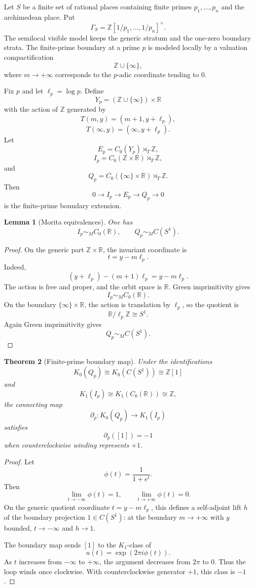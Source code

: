 \documentclass[11pt]{article}
\newtheorem{theorem}{Theorem}[section]
\newtheorem{lemma}[theorem]{Lemma}
\newcommand{\ZZ}{\mathbb Z}
\newcommand{\RR}{\mathbb R}
\begin{document}
Let $S$ be a finite set of rational places containing finite primes $p_1,\ldots,p_n$ and the archimedean place.  Put
\[
        \Gamma_S=\ZZ[1/p_1,\ldots,1/p_n]^\times.
\]
The semilocal visible model keeps the generic stratum and the one-zero boundary strata.  The finite-prime boundary at a prime $p$ is modeled locally by a valuation compactification
\[
        \ZZ\cup\{\infty\},
\]
where $m\to+\infty$ corresponds to the $p$-adic coordinate tending to $0$.

Fix $p$ and let $\ell_p=\log p$.  Define
\[
        Y_p=(\ZZ\cup\{\infty\})\times\RR
\]
with the action of $\ZZ$ generated by
\[
        T(m,y)=(m+1,y+\ell_p),
\]
\[
        T(\infty,y)=(\infty,y+\ell_p).
\]
Let
\[
        E_p=C_0(Y_p)\rtimes_T\ZZ,
\]
\[
        I_p=C_0(\ZZ\times\RR)\rtimes_T\ZZ,
\]
and
\[
        Q_p=C_0(\{\infty\}\times\RR)\rtimes_T\ZZ.
\]
Then
\[
        0\to I_p\to E_p\to Q_p\to0
\]
is the finite-prime boundary extension.

\begin{lemma}[Morita equivalences]
One has
\[
        I_p\sim_M C_0(\RR),
        \qquad Q_p\sim_M C(S^1).
\]
\end{lemma}

\begin{proof}
On the generic part $\ZZ\times\RR$, the invariant coordinate is
\[
        t=y-m\ell_p.
\]
Indeed,
\[
        (y+\ell_p)-(m+1)\ell_p=y-m\ell_p.
\]
The action is free and proper, and the orbit space is $\RR$.  Green imprimitivity gives
\[
        I_p\sim_M C_0(\RR).
\]
On the boundary $\{\infty\}\times\RR$, the action is translation by $\ell_p$, so the quotient is
\[
        \RR/\ell_p\ZZ\cong S^1.
\]
Again Green imprimitivity gives
\[
        Q_p\sim_M C(S^1).
\]
\end{proof}

\begin{theorem}[Finite-prime boundary map]
Under the identifications
\[
        K_0(Q_p)\cong K_0(C(S^1))\cong\ZZ[1]
\]
and
\[
        K_1(I_p)\cong K_1(C_0(\RR))\cong\ZZ,
\]
the connecting map
\[
        \partial_p:K_0(Q_p)\to K_1(I_p)
\]
satisfies
\[
        \partial_p([1])=-1
\]
when counterclockwise winding represents $+1$.
\end{theorem}

\begin{proof}
Let
\[
        \phi(t)=\frac1{1+e^t}.
\]
Then
\[
        \lim_{t\to-\infty}\phi(t)=1,
        \qquad
        \lim_{t\to+\infty}\phi(t)=0.
\]
On the generic quotient coordinate $t=y-m\ell_p$, this defines a self-adjoint lift $h$ of the boundary projection $1\in C(S^1)$: at the boundary $m\to+\infty$ with $y$ bounded, $t\to-\infty$ and $h\to1$.

The boundary map sends $[1]$ to the $K_1$-class of
\[
        u(t)=\exp(2\pi i\phi(t)).
\]
As $t$ increases from $-\infty$ to $+\infty$, the argument decreases from $2\pi$ to $0$.  Thus the loop winds once clockwise.  With counterclockwise generator $+1$, this class is $-1$.
\end{proof}
\end{document}
